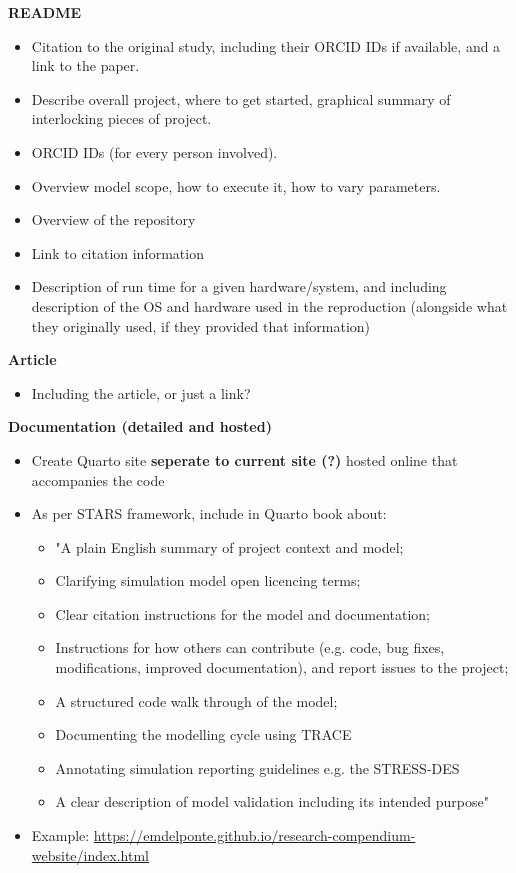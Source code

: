 \textbf{README}
\begin{itemize}
    \item Citation to the original study, including their ORCID IDs if available, and a link to the paper.
    \item Describe overall project, where to get started, graphical summary of interlocking pieces of project.\autocite{marwick_packaging_2018}
    \item ORCID IDs (for every person involved).\autocite{monks_towards_2024}
    \item Overview model scope, how to execute it, how to vary parameters.\autocite{monks_towards_2024}
    \item Overview of the repository
    \item Link to citation information
    \item Description of run time for a given hardware/system, and including description of the OS and hardware used in the reproduction (alongside what they originally used, if they provided that information)
\end{itemize}

\textbf{Article}
\begin{itemize}
    \item Including the article, or just a link?
\end{itemize}

\textbf{Documentation (detailed and hosted)}
\begin{itemize}
    \item Create Quarto site \textbf{seperate to current site (?)} hosted online that accompanies the code
    \item As per STARS framework, include in Quarto book about:
    \begin{itemize}
        \item "A plain English summary of project context and model;
        \item Clarifying simulation model open licencing terms;
        \item Clear citation instructions for the model and documentation;
        \item Instructions for how others can contribute (e.g. code, bug fixes, modifications, improved documentation), and report issues to the project;
        \item A structured code walk through of the model;
        \item Documenting the modelling cycle using TRACE\autocite{ayllon_keeping_2021}
        \item Annotating simulation reporting guidelines  e.g. the STRESS-DES
        \item A clear description of model validation including its intended purpose"
    \end{itemize}
    \item Example: \url{https://emdelponte.github.io/research-compendium-website/index.html}
\end{itemize}

